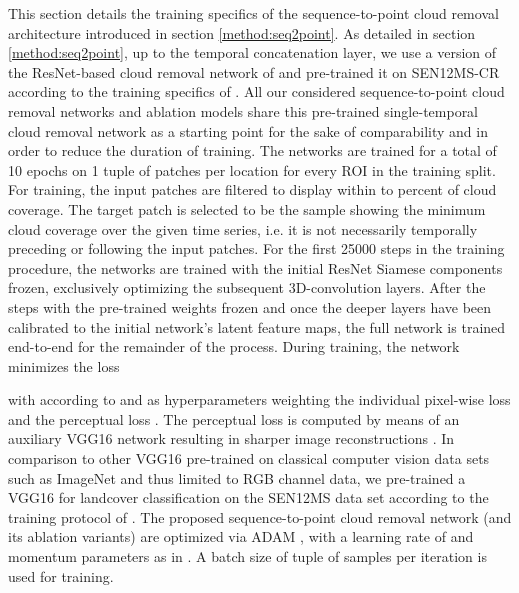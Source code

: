 \documentclass[journal]{IEEEtran}
\begin{document}
This section details the training specifics of the sequence-to-point cloud removal architecture introduced in section \ref{method:seq2point}.
As detailed in section \ref{method:seq2point}, up to the temporal concatenation layer, we use a version of the ResNet-based \cite{he2016deep} cloud removal network of \cite{meraner2020cloud} and pre-trained it on SEN12MS-CR \cite{ebel2020multisensor} according to the training specifics of \cite{meraner2020cloud}. All our considered sequence-to-point cloud removal networks and ablation models share this pre-trained single-temporal cloud removal network as a starting point for the sake of comparability and in order to reduce the duration of training. The networks are trained for a total of 10 epochs on 1 tuple of patches per location for every ROI in the training split. For training, the input  patches are filtered to display within  to  percent of cloud coverage. The target  patch is selected to be the sample showing the minimum cloud coverage over the given time series, i.e. it is not necessarily temporally preceding or following the input patches. For the first 25000 steps in the training procedure, the networks are trained with the initial ResNet Siamese components frozen, exclusively optimizing the subsequent 3D-convolution layers. After the steps with the pre-trained weights frozen and once the deeper layers have been calibrated to the initial network's latent feature maps, the full network is trained end-to-end for the remainder of the process. During training, the network minimizes the loss  








with  according to \cite{Sarukkai_Jain_Uzkent_Ermon_2019} and  as hyperparameters weighting the individual pixel-wise loss  and the perceptual loss . The perceptual loss is computed by means of an auxiliary VGG16 network \cite{Simonyan_Zisserman_2014} resulting in sharper image reconstructions \cite{johnson2016perceptual}. In comparison to other VGG16 pre-trained on classical computer vision data sets such as ImageNet \cite{russakovsky2015imagenet} and thus limited to RGB channel data, we pre-trained a VGG16 for landcover classification on the SEN12MS data set \cite{schmitt2019sen12ms} according to the training protocol of \cite{schmitt2021remote}. The proposed sequence-to-point cloud removal network (and its ablation variants) are optimized via ADAM \cite{kingma2014adam}, with a learning rate of  and momentum parameters  as in \cite{Sarukkai_Jain_Uzkent_Ermon_2019}. A batch size of  tuple of samples per iteration is used for training.
\end{document}
